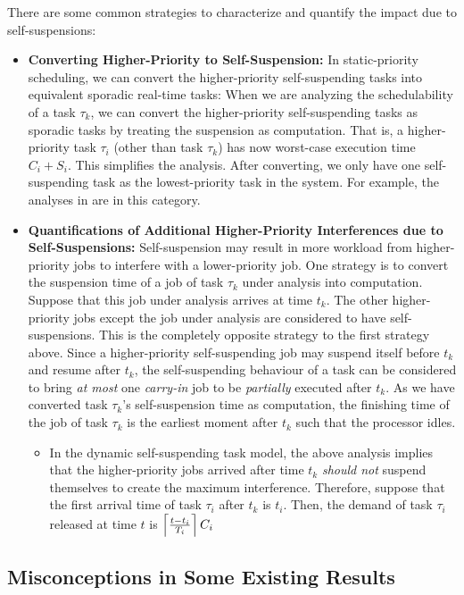 There are some common strategies to characterize and quantify the impact due to self-suspensions:
\begin{itemize}
\item {\bf Converting Higher-Priority to Self-Suspension:} In static-priority scheduling, we can convert the higher-priority self-suspending tasks into equivalent sporadic real-time tasks: When we are analyzing the schedulability of a task $\tau_k$, we can convert the higher-priority self-suspending tasks as sporadic tasks by treating the suspension as computation. That is, a higher-priority task $\tau_i$ (other than task $\tau_k$) has now worst-case execution time $C_i+S_i$. This simplifies the analysis. After converting, we only have one self-suspending task as the lowest-priority task in the system. For example, the analyses in \cite{LR:rtas10,ecrts15nelissen} are in this category.
\item {\bf Quantifications of Additional Higher-Priority Interferences due to Self-Suspensions:} Self-suspension may result in more workload from higher-priority jobs to interfere with a lower-priority job. One strategy is to convert the suspension time of a job of task $\tau_k$ under analysis into computation. Suppose that this job under analysis arrives at time $t_k$. The other higher-priority jobs except the job under analysis are considered to have self-suspensions. This is the completely opposite strategy to the first strategy above. Since a higher-priority self-suspending job may suspend itself before $t_k$ and resume after $t_k$, the self-suspending behaviour of a task can be considered to bring \emph{at most} one \emph{carry-in} job to be \emph{partially} executed after $t_k$. As we have converted task $\tau_k$'s self-suspension time as computation, the finishing time of the job of task $\tau_k$ is the earliest moment after $t_k$ such that the processor idles. 
\begin{itemize}
\item In the dynamic self-suspending task model, the above analysis implies that the higher-priority jobs arrived after time $t_k$ \emph{should not} suspend themselves to create the maximum interference. Therefore, suppose that the first arrival time of task $\tau_i$ after $t_k$ is $t_i$. Then, the demand of task $\tau_i$ released at time $t$ is $\left\lceil{\frac{t-t_i}{T_i}}\right\rceil C_i$
\end{itemize}
\end{itemize}


\subsection{Misconceptions in Some Existing Results}
